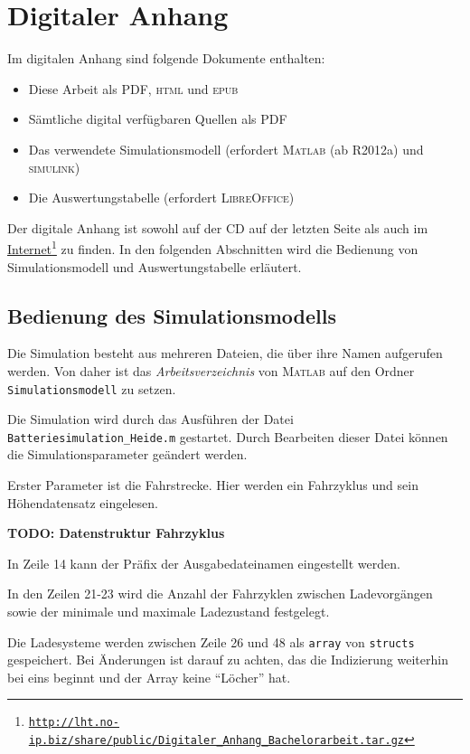 
\chapter{Digitaler Anhang}
\label{an_Digital}
Im digitalen Anhang sind folgende Dokumente enthalten:
\begin{itemize}
	\item Diese Arbeit als \textsc{PDF}, \textsc{html} und \textsc{epub}
	\item Sämtliche digital verfügbaren Quellen als PDF
	\item Das verwendete Simulationsmodell (erfordert \textsc{Matlab} (ab R2012a) und \textsc{simulink})
	\item Die Auswertungstabelle (erfordert \textsc{LibreOffice})
\end{itemize}

Der digitale Anhang ist sowohl auf der CD auf der letzten Seite als auch im \href{http://lht.no-ip.biz/share/public/Digitaler\_Anhang\_Bachelorarbeit.tar.gz}{Internet}\footnote{\href{http://lht.no-ip.biz/share/public/Digitaler_Anhang_Bachelorarbeit.tar.gz}{\texttt{http://lht.no-ip.biz/share/public/Digitaler\_Anhang\_Bachelorarbeit.tar.gz}}} zu finden. In den folgenden Abschnitten wird die Bedienung von Simulationsmodell und Auswertungstabelle erläutert.

\section{Bedienung des Simulationsmodells}
Die Simulation besteht aus mehreren Dateien, die über ihre Namen aufgerufen werden. Von daher ist das \emph{Arbeitsverzeichnis} von \textsc{Matlab} auf den Ordner \texttt{Simulationsmodell} zu setzen.

Die Simulation wird durch das Ausführen der Datei \texttt{Batteriesimulation\_Heide.m} gestartet. Durch Bearbeiten dieser Datei können die Simulationsparameter geändert werden.

Erster Parameter ist die Fahrstrecke. Hier werden ein Fahrzyklus und sein Höhendatensatz eingelesen.

\textbf{TODO: Datenstruktur Fahrzyklus}

In Zeile 14 kann der Präfix der Ausgabedateinamen eingestellt werden.

In den Zeilen 21-23 wird die Anzahl der Fahrzyklen zwischen Ladevorgängen sowie der minimale und maximale Ladezustand festgelegt.

Die Ladesysteme werden zwischen Zeile 26 und 48 als \texttt{array} von \texttt{structs} gespeichert. Bei Änderungen ist darauf zu achten, das die Indizierung weiterhin bei eins beginnt und der Array keine "`Löcher"' hat.

